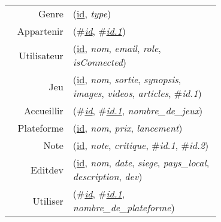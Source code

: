 
\usepackage[normalem]{ulem}
\newenvironment{mld}
  {\par\begin{minipage}{\linewidth}\begin{tabular}{rp{0.7\linewidth}}}
  {\end{tabular}\end{minipage}\par}
\newcommand{\relat}[1]{\textsc{#1}}
\newcommand{\attr}[1]{\emph{#1}}
\newcommand{\prim}[1]{\uline{#1}}
\newcommand{\foreign}[1]{\#\textsl{#1}}


\begin{mld}
  Genre & (\prim{id}, \attr{type})\\
  Appartenir & (\foreign{\prim{id}}, \foreign{\prim{id.1}})\\
  Utilisateur & (\prim{id}, \attr{nom}, \attr{email}, \attr{role}, \attr{isConnected})\\
  Jeu & (\prim{id}, \attr{nom}, \attr{sortie}, \attr{synopsis}, \attr{images}, \attr{videos}, \attr{articles}, \foreign{id.1})\\
  Accueillir & (\foreign{\prim{id}}, \foreign{\prim{id.1}}, \attr{nombre\_de\_jeux})\\
  Plateforme & (\prim{id}, \attr{nom}, \attr{prix}, \attr{lancement})\\
  Note & (\prim{id}, \attr{note}, \attr{critique}, \foreign{id.1}, \foreign{id.2})\\
  Editdev & (\prim{id}, \attr{nom}, \attr{date}, \attr{siege}, \attr{pays\_local}, \attr{description}, \attr{dev})\\
  Utiliser & (\foreign{\prim{id}}, \foreign{\prim{id.1}}, \attr{nombre\_de\_plateforme})\\
\end{mld}